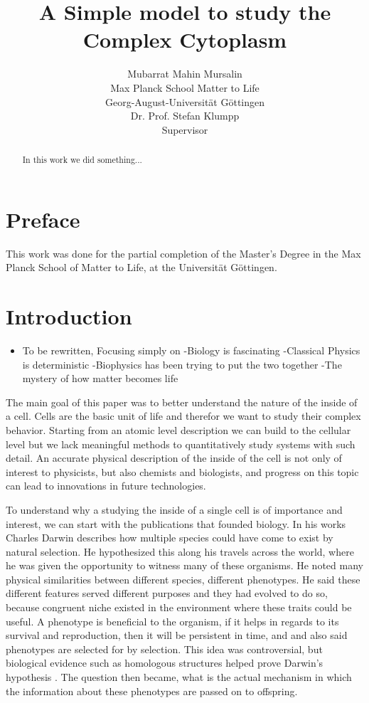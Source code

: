 \documentclass{article}
\title{A Simple model to study the Complex Cytoplasm}
\date{\displaydate{articleDate}}
\author{Mubarrat Mahin Mursalin\\
Max Planck School Matter to Life\\Georg-August-Universität Göttingen\\\AND
Dr. Prof. Stefan Klumpp\\
Supervisor\\}
\begin{document}
\maketitle

\begin{abstract}
In this work we did something...
\end{abstract}

\keywords{}

\section{Preface}

This work was done for the partial completion of the Master's Degree in the Max Planck School of Matter to Life, at the Universität Göttingen.

\section{Introduction}

\begin{itemize}
\item To be rewritten, Focusing simply on\newline
-Biology is fascinating\newline
-Classical Physics is deterministic\newline
-Biophysics has been trying to put the two together\newline
-The mystery of how matter becomes life
\end{itemize}

The main goal of this paper was to better understand the nature of the inside of a cell. Cells are the basic unit of life and therefor we want to study their complex behavior. Starting from an atomic level description we can build to the cellular level but we lack meaningful methods to quantitatively study systems with such detail. An accurate physical description of the inside of the cell is not only of interest to physicists, but also chemists and biologists, and progress on this topic can lead to innovations in future technologies.

To understand why a studying the inside of a single cell is of importance and interest, we can start with the publications that founded biology. In his works  Charles Darwin describes how multiple species could have come to exist by natural selection. He hypothesized this along his travels across the world, where he was given the opportunity to witness many of these organisms. He noted many physical similarities between different species, different phenotypes. He said these different features served different purposes and they had evolved to do so, because congruent niche existed in the environment where these traits could be useful. A phenotype is beneficial to the organism, if it helps in regards to its survival and reproduction, then it will be persistent in time, and and also said phenotypes are selected for by selection. This idea was controversial, but biological evidence such as homologous structures helped prove Darwin's hypothesis . The question then became, what is the actual mechanism in which the information about these phenotypes are passed on to offspring.
\end{document}
